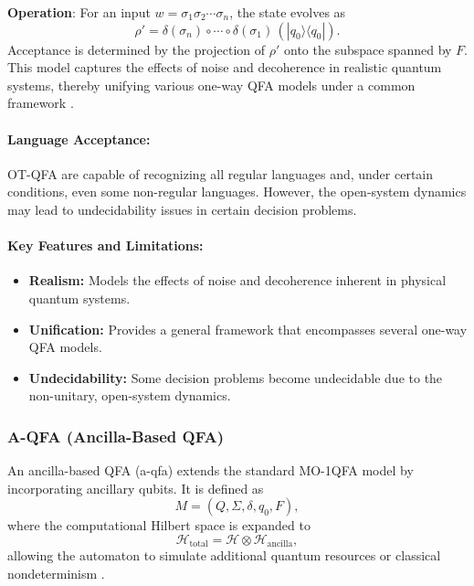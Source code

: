 \textbf{Operation}:  
For an input \( w = \sigma_1\sigma_2\cdots\sigma_n \), the state evolves as
\[
\rho' = \delta(\sigma_n) \circ \cdots \circ \delta(\sigma_1) \, (|q_0\rangle\langle q_0|).
\]
Acceptance is determined by the projection of \( \rho' \) onto the subspace spanned by \( F \). This model captures the effects of noise and decoherence in realistic quantum systems, thereby unifying various one-way QFA models under a common framework \cite{hirvensalo2012quantum}.

\paragraph{Language Acceptance:}  
OT-QFA are capable of recognizing all regular languages and, under certain conditions, even some non-regular languages. However, the open-system dynamics may lead to undecidability issues in certain decision problems.

\paragraph{Key Features and Limitations:}
\begin{itemize}
    \item \textbf{Realism:} Models the effects of noise and decoherence inherent in physical quantum systems.
    \item \textbf{Unification:} Provides a general framework that encompasses several one-way QFA models.
    \item \textbf{Undecidability:} Some decision problems become undecidable due to the non-unitary, open-system dynamics.
\end{itemize}

\subsubsection{A-QFA (Ancilla-Based QFA)}
\label{sssec:a-qfa}
\begin{definition}[A-QFA]
An ancilla-based QFA (\gls{a-qfa}) extends the standard MO-1QFA model by incorporating ancillary qubits. It is defined as 
\[
M = (Q, \Sigma, \delta, q_0, F),
\]
where the computational Hilbert space is expanded to 
\[
\mathcal{H}_{\text{total}} = \mathcal{H} \otimes \mathcal{H}_{\text{ancilla}},
\]
allowing the automaton to simulate additional quantum resources or classical nondeterminism \cite{paschen2000quantum}.
\end{definition}

